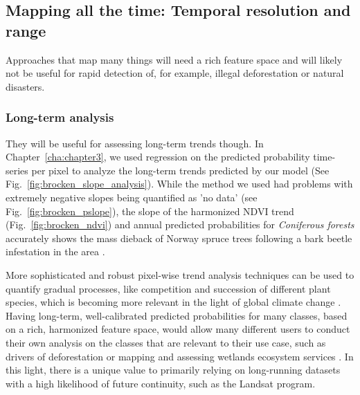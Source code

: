     \subsection{Mapping all the time: Temporal resolution and range}
        \label{syn:allthetime}

        Approaches that map many things will need a rich feature space and will likely not be useful for rapid detection of, for example, illegal deforestation or natural disasters. 

        \subsubsection{Long-term analysis}
        They will be useful for assessing long-term trends though. In Chapter\@~\ref{cha:chapter3}, we used regression on the predicted probability time-series per pixel to analyze the long-term trends predicted by our model (See Fig.\@~\ref{fig:brocken_slope_analysis}). While the method we used had problems with extremely negative slopes being quantified as 'no data' (see Fig.\@~\ref{fig:brocken_pslope}), the slope of the harmonized NDVI trend (Fig.\@~\ref{fig:brocken_ndvi}) and annual predicted probabilities for \textit{Coniferous forests} accurately shows the mass dieback of Norway spruce trees following a bark beetle infestation in the area \citep{meyer2017matter}.

        More sophisticated and robust pixel-wise trend analysis techniques can be used to quantify gradual processes, like competition and succession of different plant species, which is becoming more relevant in the light of global climate change \citep{bonannella2023biomes}. Having long-term, well-calibrated predicted probabilities for many classes, based on a rich, harmonized feature space, would allow many different users to conduct their own analysis on the classes that are relevant to their use case, such as drivers of deforestation \citep{masolele2024mapping} or mapping and assessing wetlands ecosystem services \citep{fitoka2020water}. In this light, there is a unique value to primarily relying on long-running datasets with a high likelihood of future continuity, such as the Landsat program.
        
